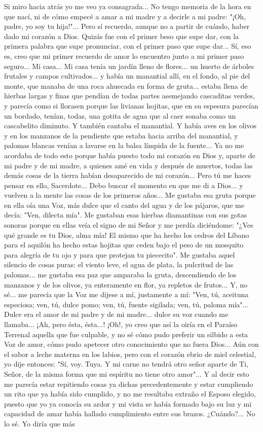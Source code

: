 \documentclass[12pt]{book} %
\begin{document}
Si miro hacia atrás yo me veo ya consagrada... No tengo memoria de la hora en que nací, ni de cómo empecé a amar a 
mi madre y a decirle a mi padre: "¡Oh, padre, yo soy tu hija!"... Pero sí recuerdo, aunque no a partir de cuándo, haber dado mi corazón a Dios. Quizás fue con el primer beso que supe dar, con la primera palabra que supe pronunciar, con el primer paso que supe dar... Sí, eso es, creo que mi primer recuerdo de amor lo encuentro junto a mi primer paso seguro... Mi casa... Mi casa tenía un jardín lleno de flores... un huerto de árboles frutales y campos cultivados... y había un manantial allí, en el fondo, al pie del monte, que manaba de una roca ahuecada en forma de gruta... estaba llena de hierbas largas y finas que pendían de todas partes asemejando cascaditas verdes, y parecía como si llorasen porque las livianas hojitas, que en su espesura parecían un bordado, tenían, todas, una gotita de agua que al caer sonaba como un cascabelito diminuto. Y también cantaba el manantial. Y había aves en los olivos y en los manzanos de la pendiente que estaba hacia arriba del manantial, y palomas blancas venían a lavarse en la balsa límpida de la fuente... Ya no me acordaba de todo esto porque había puesto todo mi corazón en Dios y, aparte de mi padre y de mi madre, a quienes amé en vida y después de muertos, todas las demás cosas de la tierra habían desaparecido de mi corazón... Pero tú me haces pensar en ello, Sacerdote... Debo buscar el momento en que me di a Dios... y vuelven a la mente las cosas de los primeros años... Me gustaba esa gruta porque en ella oía una Voz, más dulce que el canto del agua y de los pájaros, que me decía: "Ven, dilecta mía". Me gustaban esas hierbas diamantinas con sus gotas sonoras porque en ellas veía el signo de mi Señor y me perdía diciéndome: "¿Ves qué grande es tu Dios, alma mía! El mismo que ha hecho los cedros del Líbano para el aquilón ha hecho estas hojitas que ceden bajo el peso de un mosquito para alegría de tu ojo y para que protejan tu piececito". Me gustaba aquel silencio de cosas puras: el viento leve, el agua de plata, la pulcritud de las palomas... me gustaba esa paz que amparaba la gruta, descendiendo de los manzanos y de los olivos, ya enteramente en flor, ya repletos de frutos... Y, no sé... me parecía que la Voz me dijese a mí, justamente a mí: "Ven, tú, aceituna especiosa; ven, tú, dulce pomo; ven, tú, fuente sigilada; ven, tú, paloma mía"... Dulce era el amor de mi padre y de mi madre... dulce su voz cuando me llamaba... ¡Ah, pero ésta, ésta...! ¡Oh!, yo creo que así la oiría en el Paraíso Terrenal aquella que fue culpable, y no sé cómo pudo preferir un silbido a esta Voz de amor, cómo pudo apetecer otro conocimiento que no fuera Dios... Aún con el sabor a leche materna en los labios, pero con el corazón ebrio de miel celestial, yo dije entonces: "Sí, voy. Tuya. Y mi carne no tendrá otro señor aparte de Ti, Señor, de la misma forma que mi espíritu no tiene otro amor"... Y al decir esto me parecía estar repitiendo cosas ya dichas precedentemente y estar cumpliendo un rito que ya había sido cumplido, y no me resultaba extraño el Esposo elegido, puesto que yo ya conocía su ardor y mi vista se había formado bajo su luz y mi capacidad de amar había hallado cumplimiento entre sus brazos. ¿Cuándo?... No lo sé. Yo diría que más 
\end{document}
